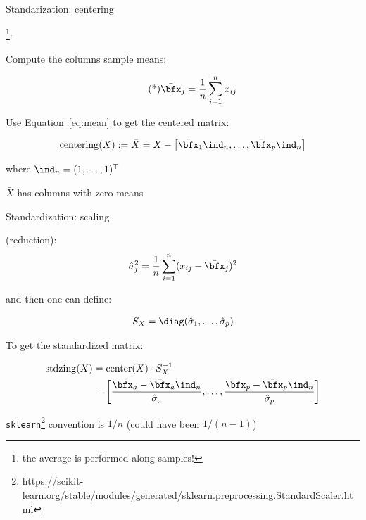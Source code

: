 \documentclass[unknownkeysallowed]{beamer}
\begin{document}
\begin{frame}{Standarization: centering} %

\footnote{the average is performed along samples!}:

Compute the columns sample means:

\begin{align}\label{eq:mean}\tag{*}
 \bar{\bfx}_{j} = \frac{1}{n} \sum_{i=1}^{n} x_{ij}
\end{align}

Use Equation~\eqref{eq:mean} to get the centered matrix:

\begin{align*}
	{\rm centering} (X) := \bar{X} = X - \left[\bar{\bfx}_{1}\ind_n,\dots,\bar{\bfx}_{p}\ind_n\right]
\end{align*}

where $\ind_n=(1,\dots,1)^\top$

\vspace{0.4cm}

\rem $\bar{X}$ has columns with zero means

\end{frame}

\begin{frame}{Standardization: scaling}

 (reduction):
\begin{align*}
	\hat\sigma_{j}^2 = \frac{1}{n} \sum_{i=1}^{n} (x_{ij}-\bar{\bfx}_{j})^2
\end{align*}


and then one can define:

\begin{align*}
	S_X = \diag(\hat\sigma_{1},\dots, \hat\sigma_{p})
\end{align*}


To get the standardized matrix:

\begin{align*}
	{\rm stdzing}(X)
	& = {\rm center}(X) \cdot S_X^{-1} \\
	& = \left[\frac{\bfx_{a}-\bar{\bfx}_{a}\ind_n}{\hat\sigma_{a}},
			  \dots,
   	          \frac{\bfx_{p}-\bar{\bfx}_{p}\ind_n}{\hat\sigma_{p}}
        \right]
\end{align*}

\rem  \texttt{sklearn}\footnote{\url{https://scikit-learn.org/stable/modules/generated/sklearn.preprocessing.StandardScaler.html}} convention is $1/n$ (could have been $1/(n-1)$)

\end{frame}
\end{document}
